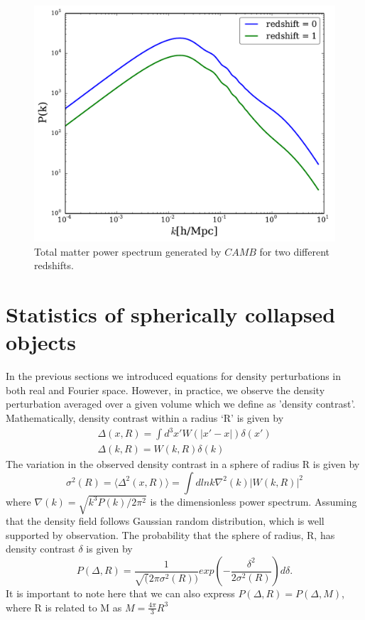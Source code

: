 \begin{figure}[H]
\includegraphics[width = \columnwidth]{figs/ps.pdf}
\caption{Total matter power spectrum generated by $CAMB$ for two different redshifts.}
\label{fig_ps}
\end{figure}

\section{Statistics of spherically collapsed objects}
\label{stats}
In the previous sections we introduced equations for density perturbations in both real and Fourier space. However, in practice, we observe the density perturbation averaged over a given volume which we define as 'density contrast'. Mathematically, density contrast within a radius `R' is given by
\begin{eqnarray}
\Delta(x, R) = \int d^{3}x' W(|x' - x|) \delta(x') \\
\Delta(k, R) = W(k,R) \delta(k)
\end{eqnarray}
The variation in the observed density contrast in a sphere of radius R is given by
\begin{equation}
\sigma^{2}(R) = \langle \Delta^{2}(x,R) \rangle = \int d lnk \nabla^{2}(k) |W(k,R)|^{2}
\end{equation}
where $\nabla(k) = \sqrt{k^{3}P(k)/2\pi^{2}}$ is the dimensionless power spectrum.
Assuming that the density field follows Gaussian random distribution, which is well supported by observation. The probability that the sphere of radius, R, has density contrast $\delta$ is given by
\begin{equation}
P(\Delta, R) = \frac{1}{\sqrt(2 \pi \sigma^{2}(R))} exp(-\frac{\delta^{2}}{2\sigma^{2}(R)}) d\delta.
\end{equation}
It is important to note here that we can also express $P(\Delta, R) = P(\Delta, M)$, where R is related to M as $M = \frac{4\pi}{3} R^{3}$
